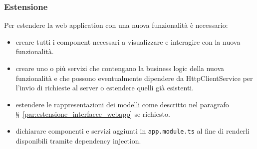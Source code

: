 \documentclass[../../manuale-manutentore.tex]{subfiles}
\begin{document}


\subsubsection{Estensione}%
\label{subs:estensione_webapp}

Per estendere la web application con una nuova funzionalità è necessario:

\begin{itemize}
  \item creare tutti i component necessari a visualizzare e interagire con la nuova funzionalità.
  \item creare uno o più servizi che contengano la business logic della nuova funzionalità e che possono eventualmente dipendere da HttpClientService per l'invio di richieste al server o estendere quelli già esistenti.
  \item estendere le rappresentazioni dei modelli come descritto nel paragrafo §~\ref{par:estensione_interfacce_webapp} se richiesto.
  \item dichiarare componenti e servizi aggiunti in \texttt{app.module.ts} al fine di renderli disponibili tramite dependency injection.
\end{itemize}
\end{document}
